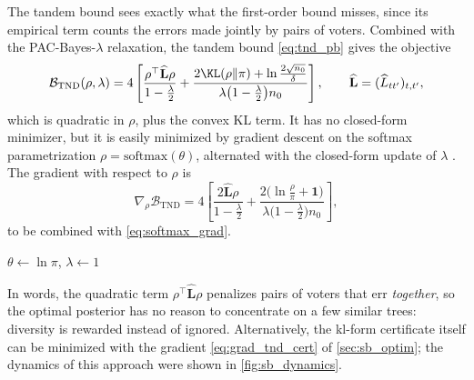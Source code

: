 The tandem bound sees exactly what the first-order bound misses, since its
empirical term counts the errors made jointly by pairs of voters. Combined with
the PAC-Bayes-$\lambda$ relaxation, the tandem bound \eqref{eq:tnd_pb} gives the objective
\begin{equation}\label{eq:tnd_objective}
\mathcal B_{\text{TND}}(\rho,\lambda)=4\left[\frac{\rho^\top\widehat{\mathbf L}\rho}{1-\frac\lambda2}+\frac{2\KL(\rho\|\pi)+\ln\frac{2\sqrt{n_0}}{\delta}}{\lambda\big(1-\frac\lambda2\big)n_0}\right],
\qquad\widehat{\mathbf L}=(\widehat L_{tt'})_{t,t'},
\end{equation}
which is quadratic in $\rho$, plus the convex KL term. It has no closed-form
minimizer, but it is easily minimized by gradient descent on the softmax
parametrization $\rho=\mathrm{softmax}(\theta)$, alternated with the closed-form
update of $\lambda$ \citep{masegosa2020second}. The gradient with respect to $\rho$ is
\begin{equation}\label{eq:grad_tnd_lambda}
\nabla_\rho\mathcal B_{\text{TND}}=4\left[\frac{2\widehat{\mathbf L}\rho}{1-\frac\lambda2}+\frac{2\big(\ln\frac{\rho}{\pi}+\mathbf 1\big)}{\lambda\big(1-\frac\lambda2\big)n_0}\right],
\end{equation}
to be combined with \eqref{eq:softmax_grad}.

\begin{algorithm}[h]
\caption{Tandem bound minimization for a forest \citep{masegosa2020second}}\label{algo:tnd}
$\theta\leftarrow\ln\pi$, $\lambda\leftarrow1$\;
\end{algorithm}

In words, the quadratic term $\rho^\top\widehat{\mathbf L}\rho$ penalizes pairs of voters that
err \emph{together}, so the optimal posterior has no reason to concentrate on
a few similar trees: diversity is rewarded instead of ignored. Alternatively, the kl-form certificate itself can be
minimized with the gradient \eqref{eq:grad_tnd_cert} of \cref{sec:sb_optim}; the
dynamics of this approach were shown in \cref{fig:sb_dynamics}.

